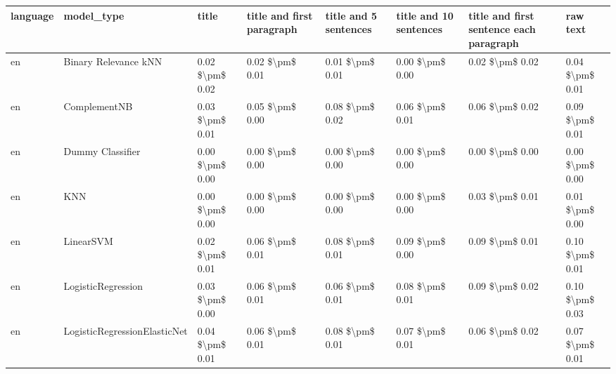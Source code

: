 \begin{tabular}{llllllll}
\toprule
language &                      model\_type &           title & title and first paragraph & title and 5 sentences & title and 10 sentences & title and first sentence each paragraph &            raw text \\
\midrule
      en &            Binary Relevance kNN & 0.02 \$\textbackslash pm\$ 0.02 &           0.02 \$\textbackslash pm\$ 0.01 &       0.01 \$\textbackslash pm\$ 0.01 &        0.00 \$\textbackslash pm\$ 0.00 &                         0.02 \$\textbackslash pm\$ 0.02 &     0.04 \$\textbackslash pm\$ 0.01 \\
      en &                    ComplementNB & 0.03 \$\textbackslash pm\$ 0.01 &           0.05 \$\textbackslash pm\$ 0.00 &       0.08 \$\textbackslash pm\$ 0.02 &        0.06 \$\textbackslash pm\$ 0.01 &                         0.06 \$\textbackslash pm\$ 0.02 &     0.09 \$\textbackslash pm\$ 0.01 \\
      en &                Dummy Classifier & 0.00 \$\textbackslash pm\$ 0.00 &           0.00 \$\textbackslash pm\$ 0.00 &       0.00 \$\textbackslash pm\$ 0.00 &        0.00 \$\textbackslash pm\$ 0.00 &                         0.00 \$\textbackslash pm\$ 0.00 &     0.00 \$\textbackslash pm\$ 0.00 \\
      en &                             KNN & 0.00 \$\textbackslash pm\$ 0.00 &           0.00 \$\textbackslash pm\$ 0.00 &       0.00 \$\textbackslash pm\$ 0.00 &        0.00 \$\textbackslash pm\$ 0.00 &                         0.03 \$\textbackslash pm\$ 0.01 &     0.01 \$\textbackslash pm\$ 0.00 \\
      en &                       LinearSVM & 0.02 \$\textbackslash pm\$ 0.01 &           0.06 \$\textbackslash pm\$ 0.01 &       0.08 \$\textbackslash pm\$ 0.01 &        0.09 \$\textbackslash pm\$ 0.00 &                         0.09 \$\textbackslash pm\$ 0.01 &     0.10 \$\textbackslash pm\$ 0.01 \\
      en &              LogisticRegression & 0.03 \$\textbackslash pm\$ 0.00 &           0.06 \$\textbackslash pm\$ 0.01 &       0.06 \$\textbackslash pm\$ 0.01 &        0.08 \$\textbackslash pm\$ 0.01 &                         0.09 \$\textbackslash pm\$ 0.02 &     0.10 \$\textbackslash pm\$ 0.03 \\
      en &    LogisticRegressionElasticNet & 0.04 \$\textbackslash pm\$ 0.01 &           0.06 \$\textbackslash pm\$ 0.01 &       0.08 \$\textbackslash pm\$ 0.01 &        0.07 \$\textbackslash pm\$ 0.01 &                         0.06 \$\textbackslash pm\$ 0.02 &     0.07 \$\textbackslash pm\$ 0.01 \\

\end{tabular}
